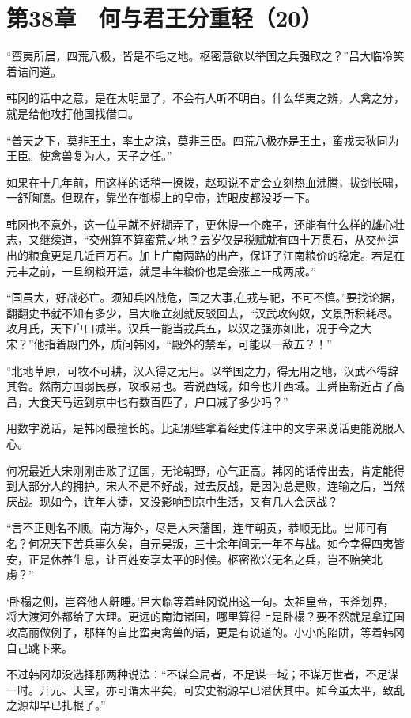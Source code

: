 \section{第38章　何与君王分重轻（20）}

“蛮夷所居，四荒八极，皆是不毛之地。枢密意欲以举国之兵强取之？”吕大临冷笑着诘问道。

韩冈的话中之意，是在太明显了，不会有人听不明白。什么华夷之辨，人禽之分，就是给他攻打他国找借口。

“普天之下，莫非王土，率土之滨，莫非王臣。四荒八极亦是王土，蛮戎夷狄同为王臣。使禽兽复为人，天子之任。”

如果在十几年前，用这样的话稍一撩拨，赵顼说不定会立刻热血沸腾，拔剑长啸，一舒胸臆。但现在，靠坐在御榻上的皇帝，连眼皮都没眨一下。

韩冈也不意外，这一位早就不好糊弄了，更休提一个瘫子，还能有什么样的雄心壮志，又继续道，“交州算不算蛮荒之地？去岁仅是税赋就有四十万贯石，从交州运出的粮食更是几近百万石。加上广南两路的出产，保证了江南粮价的稳定。若是在元丰之前，一旦纲粮开运，就是丰年粮价也是会涨上一成两成。”

“国虽大，好战必亡。须知兵凶战危，国之大事,在戎与祀，不可不慎。”要找论据，翻翻史书就不知有多少，吕大临立刻就反驳回去，“汉武攻匈奴，文景所积耗尽。攻月氏，天下户口减半。汉兵一能当戎兵五，以汉之强亦如此，况于今之大宋？”他指着殿门外，质问韩冈，“殿外的禁军，可能以一敌五？！”

“北地草原，可牧不可耕，汉人得之无用。以举国之力，得无用之地，汉武不得辞其咎。然南方国弱民寡，攻取易也。若说西域，如今也开西域。王舜臣新近占了高昌，大食天马运到京中也有数百匹了，户口减了多少吗？”

用数字说话，是韩冈最擅长的。比起那些拿着经史传注中的文字来说话更能说服人心。

何况最近大宋刚刚击败了辽国，无论朝野，心气正高。韩冈的话传出去，肯定能得到大部分人的拥护。宋人不是不好战，过去反战，是因为总是败，连输之后，当然厌战。现如今，连年大捷，又没影响到京中生活，又有几人会厌战？

“言不正则名不顺。南方海外，尽是大宋藩国，连年朝贡，恭顺无比。出师可有名？何况天下苦兵事久矣，自元昊叛，三十余年间无一年不与战。如今幸得四夷皆安，正是休养生息，让百姓安享太平的时候。枢密欲兴无名之兵，岂不贻笑北虏？”

‘卧榻之侧，岂容他人鼾睡。’吕大临等着韩冈说出这一句。太祖皇帝，玉斧划界，将大渡河外都给了大理。更远的南海诸国，哪里算得上是卧榻？要不然就是拿辽国攻高丽做例子，那样的自比蛮夷禽兽的话，更是有说道的。小小的陷阱，等着韩冈自己跳下来。

不过韩冈却没选择那两种说法：“不谋全局者，不足谋一域；不谋万世者，不足谋一时。开元、天宝，亦可谓太平矣，可安史祸源早已潜伏其中。如今虽太平，致乱之源却早已扎根了。”

